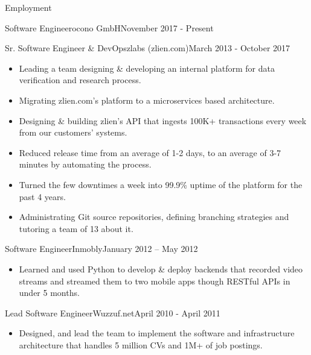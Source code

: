 \documentclass[]{mosabcv}
\begin{document}
	\makeheader
	
	
	\begin{cvsection}{Employment}
		\begin{cvsubsection}{Software Engineer}{ocono GmbH}{November 2017 - Present}

		\end{cvsubsection}
		\begin{cvsubsection}{Sr. Software Engineer \& DevOps}{zlabs (zlien.com)}{March 2013 - October 2017}
		\begin{itemize}
				\item Leading a team designing \& developing an internal platform for data verification and research process.
				\item Migrating zlien.com's platform to a microservices based architecture.
				\item Designing \& building zlien's API that ingests 100K+ transactions every week from our customers' systems.
				\item Reduced release time from an average of 1-2 days, to an average of 3-7 minutes by automating the process.
				\item Turned the few downtimes a week into 99.9\% uptime of the platform for the past 4 years.
				\item Administrating Git source repositories, defining branching strategies and tutoring a team of 13 about it.
			\end{itemize}
		\end{cvsubsection}
		
		\begin{cvsubsection}{Software Engineer}{Inmobly}{January 2012 – May 2012}		
			\begin{itemize}
				\item Learned and used Python to develop \& deploy backends that recorded video streams and streamed them to two mobile apps though RESTful APIs in under 5 months.
			\end{itemize}
		\end{cvsubsection}
		
		\begin{cvsubsection}{Lead Software Engineer}{Wuzzuf.net}{April 2010 - April 2011}			
			\begin{itemize}
				\item Designed, and lead the team to implement the software and infrastructure architecture that handles 5 million CVs and 1M+ of job postings.
			\end{itemize}
		\end{cvsubsection}
	

\end{cvsection}
\end{document}
